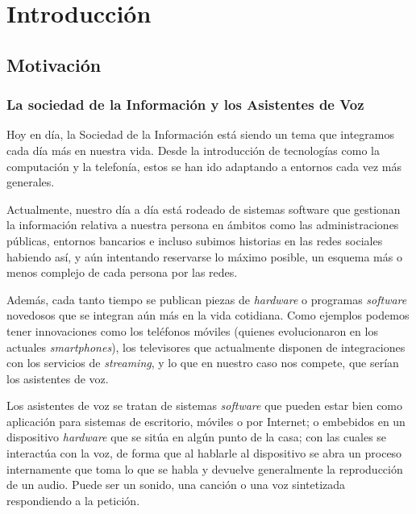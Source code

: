 \chapter{Introducción}

\noindent{}

\section{Motivación}

\subsection{La sociedad de la Información y los Asistentes de Voz}
Hoy en día, la Sociedad de la Información está siendo un tema que integramos cada día más en nuestra vida. Desde la introducción de tecnologías como la computación y la telefonía, estos se han ido adaptando a entornos cada vez más generales. 

Actualmente, nuestro día a día está rodeado de sistemas software que gestionan la información relativa a nuestra persona en ámbitos como las administraciones públicas, entornos bancarios e incluso subimos historias en las redes sociales habiendo así, y aún intentando reservarse lo máximo posible, un esquema más o menos complejo de cada persona por las redes.

Además, cada tanto tiempo se publican piezas de \textit{hardware} o programas \textit{software} novedosos que se integran aún más en la vida cotidiana. Como ejemplos podemos tener innovaciones como los teléfonos móviles (quienes evolucionaron en los actuales \textit{smartphones}), los televisores que actualmente disponen de integraciones con los servicios de \textit{streaming}, y lo que en nuestro caso nos compete, que serían los asistentes de voz.

Los asistentes de voz se tratan de sistemas \textit{software} que pueden estar bien como aplicación para sistemas de escritorio, móviles o por Internet; o embebidos en un dispositivo \textit{hardware} que se sitúa en algún punto de la casa; con las cuales se interactúa con la voz, de forma que al hablarle al dispositivo se abra un proceso internamente que toma lo que se habla y devuelve generalmente la reproducción de un audio. Puede ser un sonido, una canción o una voz sintetizada respondiendo a la petición. 

